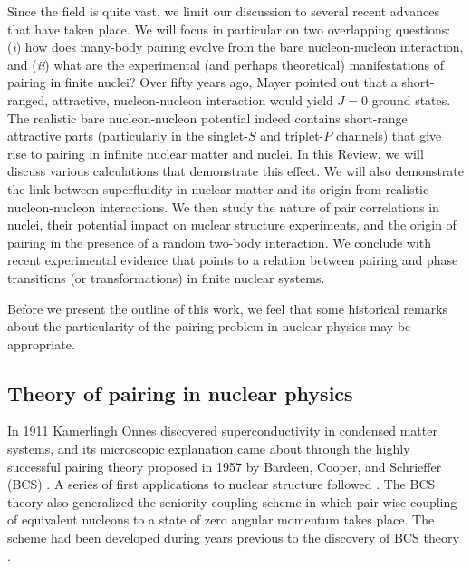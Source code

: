 \documentclass[rmp,aps,floatfix]{revtex4}
\begin{document}
Since the field
is quite vast, we limit our discussion to several recent 
advances that have taken place. We will
focus in particular on two overlapping questions: ({\it i}) how does
many-body pairing evolve from the bare nucleon-nucleon interaction, and
({\it ii}) what are the experimental (and perhaps theoretical) manifestations
of pairing in finite nuclei?  
Over fifty years ago, 
Mayer \cite{mayer_50} pointed out 
that a short-ranged, attractive, nucleon-nucleon interaction would 
yield $J=0$ ground states. The realistic bare nucleon-nucleon 
potential indeed contains short-range attractive 
parts (particularly in the singlet-$S$ and triplet-$P$ channels)
that give rise to pairing in infinite nuclear matter and nuclei. 
In this Review, we will
discuss various calculations that demonstrate this effect. We will
also demonstrate the link between superfluidity in nuclear matter
and its origin from realistic nucleon-nucleon interactions.
We then study the nature of pair correlations
in nuclei, their potential impact on nuclear structure
experiments, and the origin of pairing
in the presence of a random two-body interaction.
We conclude with recent experimental evidence that 
points to a relation between pairing and 
phase transitions (or transformations) in finite nuclear 
systems. 

Before we present the outline of this work, we feel that
some historical remarks about the particularity of the pairing 
problem in nuclear physics may be appropriate.

\subsection{Theory of pairing in nuclear physics}

In 1911 Kamerlingh Onnes discovered superconductivity in
condensed matter systems, and its microscopic explanation came 
about through the highly successful pairing theory proposed 
in 1957 by Bardeen, Cooper, and Schrieffer (BCS) 
\cite{bcs_theory}. A series of first applications to nuclear
structure followed \cite{bmp_58,belyaev_59,migdal_59}. 
The BCS theory also generalized
the seniority coupling scheme in which pair-wise coupling of 
equivalent nucleons to a state of zero angular momentum 
takes place. The scheme had been developed during
years previous to the discovery of BCS theory 
\cite{racah_42,mayer_50,racah_53}. 
\end{document}
